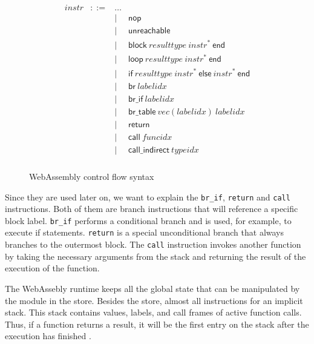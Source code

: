 \begin{figure}[h]
    \begin{equation}\nonumber
        \begin{split}
            \begin{array}{llcl}
                \mathit{instr} &::=&
                \dots \\&&|&
                \mathsf{nop} \\&&|&
                \mathsf{unreachable} \\&&|&
                \mathsf{block}~\mathit{resulttype}~\mathit{instr}^\ast~\mathsf{end} \\&&|&
                \mathsf{loop}~\mathit{resulttype}~\mathit{instr}^\ast~\mathsf{end} \\&&|&
                \mathsf{if}~\mathit{resulttype}~\mathit{instr}^\ast~\mathsf{else}~\mathit{instr}^\ast~\mathsf{end} \\&&|&
                \mathsf{br}~\mathit{labelidx} \\&&|&
                \mathsf{br\_if}~\mathit{labelidx} \\&&|&
                \mathsf{br\_table}~\mathit{vec}(\mathit{labelidx})~\mathit{labelidx} \\&&|&
                \mathsf{return} \\&&|&
                \mathsf{call}~\mathit{funcidx} \\&&|&
                \mathsf{call\_indirect}~\mathit{typeidx} \\
            \end{array}
        \end{split}
    \end{equation}
    \caption{WebAssembly control flow syntax}
    \label{fig:control_flow}
\end{figure}

Since they are used later on, we want to explain the \lstinline{br_if}, \lstinline{return} and \lstinline{call} instructions. Both of them are branch instructions that will reference a specific block label. \lstinline{br_if} performs a conditional branch and is used, for example, to execute if statements. \lstinline{return} is a special unconditional branch that always branches to the outermost block. The \lstinline{call} instruction invokes another function by taking the necessary arguments from the stack and returning the result of the execution of the function.

The WebAssebly runtime keeps all the global state that can be manipulated by the module in the store. Besides the store, almost all instructions for an implicit stack. This stack contains values, labels, and call frames of active function calls. Thus, if a function returns a result, it will be the first entry on the stack after the execution has finished \autocite{noauthor_runtime_nodate}.


